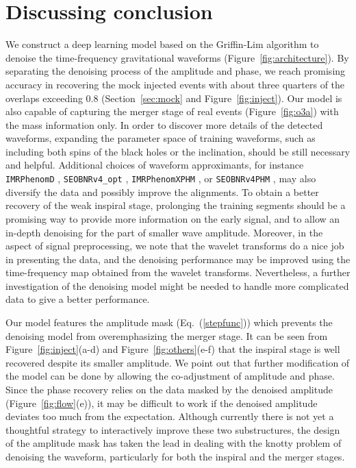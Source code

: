 \documentclass[preprint,12pt]{elsarticle}
\begin{document}
\section{\label{sec:discussion}Discussing conclusion}
We construct a deep learning model based on the Griffin-Lim algorithm to denoise the time-frequency gravitational waveforms (Figure~\ref{fig:architecture}). 
By separating the denoising process of the amplitude and phase, we reach promising accuracy in recovering the mock injected events with about three quarters of the overlaps exceeding 0.8 (Section~\ref{sec:mock} and Figure~\ref{fig:inject}).
Our model is also capable of capturing the merger stage of real events (Figure~\ref{fig:o3a}) with the mass information only. 
In order to discover more details of the detected waveforms, expanding the parameter space of training waveforms, such as including both spins of the black holes or the inclination, should be still necessary and helpful. 
Additional choices of waveform approximants, for instance \texttt{IMRPhenomD} \cite{husa2016frequency, khan2016frequency}, \texttt{SEOBNRv4\_opt} \cite{devine2016optimizing}, \texttt{IMRPhenomXPHM} \cite{pratten2021computationally}, or \texttt{SEOBNRv4PHM} \cite{ossokine2020multipolar}, may also diversify the data and possibly improve the alignments. 
To obtain a better recovery of the weak inspiral stage, prolonging the training segments should be a promising way to provide more information on the early signal, and to allow an in-depth denoising for the part of smaller wave amplitude.
Moreover, in the aspect of signal preprocessing, we note that the wavelet transforms \cite{rioul1991wavelets, chatterji2005search, virtuoso2024wavelet} do a nice job in presenting the data, and the denoising performance may be improved using the time-frequency map obtained from the wavelet transforms.
Nevertheless, a further investigation of the denoising model might be needed to handle more complicated data to give a better performance. 

Our model features the amplitude mask (Eq.~(\ref{stepfunc})) which prevents the denoising model from overemphasizing the merger stage.
It can be seen from Figure~\ref{fig:inject}(a-d) and Figure~\ref{fig:others}(e-f) that the inspiral stage is well recovered despite its smaller amplitude.
We point out that further modification of the model can be done by allowing the co-adjustment of amplitude and phase.
Since the phase recovery relies on the data masked by the denoised amplitude (Figure~\ref{fig:flow}(e)), it may be difficult to work if the denoised amplitude deviates too much from the expectation.
Although currently there is not yet a thoughtful strategy to interactively improve these two substructures, the design of the amplitude mask has taken the lead in dealing with the knotty problem of denoising the waveform, particularly for both the inspiral and the merger stages.
\end{document}
